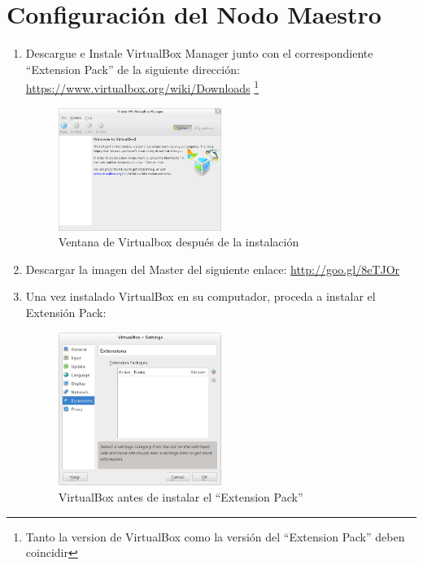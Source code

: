 \section{Configuración del Nodo Maestro}
\begin{enumerate}

\item Descargue e Instale VirtualBox Manager junto con el correspondiente ``Extension Pack'' de la siguiente dirección: \url{https://www.virtualbox.org/wiki/Downloads} \footnote{Tanto la version de VirtualBox como la versión del ``Extension Pack'' deben coincidir}

	\begin{figure}[H]
		\centering
		\includegraphics[width=0.5\textwidth]{aux/vb_instalado}
		\caption{Ventana de Virtualbox después de la instalación}
		\label{vb_instalado}
	\end{figure}


\item Descargar la imagen del Master del siguiente enlace: \url{http://goo.gl/8eTJOr}

\item Una vez instalado VirtualBox en su computador, proceda a instalar el Extensión Pack: 
	
	\begin{figure}[H]
		\centering
		\includegraphics[width=0.5\textwidth]{aux/sinextensionpack}
		\caption{VirtualBox antes de instalar el ``Extension Pack''}
	\end{figure}
	

\end{enumerate}
